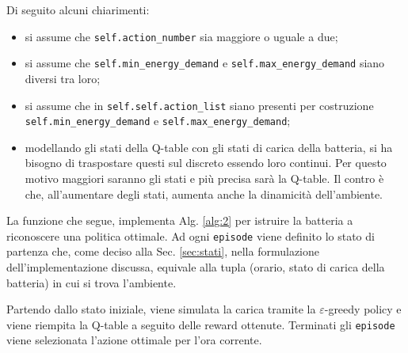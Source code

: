 \documentclass[italian, Lau, oneside]{sapthesis}
\begin{document}
Di seguito alcuni chiarimenti: 
\begin{itemize}
    \item si assume che \texttt{self.action\_number} sia maggiore o uguale a due;
    \item si assume che \texttt{self.min\_energy\_demand} e \texttt{self.max\_energy\_demand} siano diversi tra loro;
    \item si assume che in \texttt{self.self.action\_list} siano presenti per costruzione \texttt{self.min\_energy\_demand} e \texttt{self.max\_energy\_demand};
    \item modellando gli stati della Q-table con gli stati di carica della batteria, si ha bisogno di traspostare questi sul discreto essendo loro continui. Per questo motivo maggiori saranno gli stati e più precisa sarà la Q-table. Il contro è che, all'aumentare degli stati, aumenta anche la dinamicità dell'ambiente.
    
\end{itemize}


La funzione che segue, implementa Alg. \ref{alg:2} per istruire la batteria a riconoscere una politica ottimale. Ad ogni \texttt{episode} viene definito lo stato di partenza che, come deciso alla Sec. \ref{sec:stati}, nella formulazione dell’implementazione discussa, equivale alla tupla (orario, stato di carica della batteria) in cui si trova l’ambiente.

Partendo dallo stato iniziale, viene simulata la carica tramite la $\varepsilon$-greedy policy e viene riempita la Q-table a seguito delle reward ottenute. Terminati gli \texttt{episode} viene selezionata l'azione ottimale per l'ora corrente.
\newpage
\end{document}
